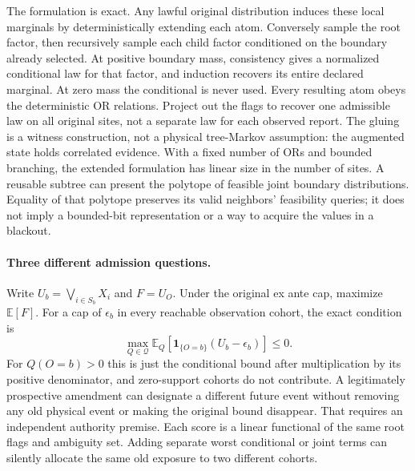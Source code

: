 \documentclass[11pt]{article}
\begin{document}
The formulation is exact. Any lawful original distribution
induces these local marginals by deterministically extending each
atom. Conversely sample the root factor, then recursively sample
each child factor conditioned on the boundary already selected.
At positive boundary mass, consistency gives a normalized
conditional law for that factor, and induction recovers its
entire declared marginal. At zero mass the conditional is never
used. Every resulting atom obeys the deterministic OR relations.
Project out the flags to recover one admissible law on all original
sites, not a separate law for each observed report. The gluing is
a witness construction, not a physical tree-Markov assumption:
the augmented state holds correlated evidence. With a fixed number
of ORs and bounded branching, the extended formulation has linear
size in the number of sites. A reusable subtree can present the
polytope of feasible joint boundary distributions. Equality of
that polytope preserves its valid neighbors' feasibility queries;
it does not imply a bounded-bit representation or a way to acquire
the values in a blackout.

\paragraph{Three different admission questions.}
Write \(U_b=\bigvee_{i\in S_b} X_i\) and \(F=U_O\).
Under the original ex ante cap, maximize \(\mathbb E[F]\).
For a cap of \(\epsilon_b\) in every reachable observation cohort,
the exact condition is
\[
 \max_{Q\in\mathcal Q}\mathbb E_Q[
      \mathbf1_{\{O=b\}}(U_b-\epsilon_b)]\le0 .
\]
For \(Q(O=b)>0\) this is just the conditional bound after
multiplication by its positive denominator, and zero-support
cohorts do not contribute. A legitimately prospective amendment
can designate a different future event without removing any old
physical event or making the original bound disappear. That
requires an independent authority premise. Each score is a
linear functional of the same root flags and ambiguity set.
Adding separate worst conditional or joint terms can silently
allocate the same old exposure to two different cohorts.
\end{document}
